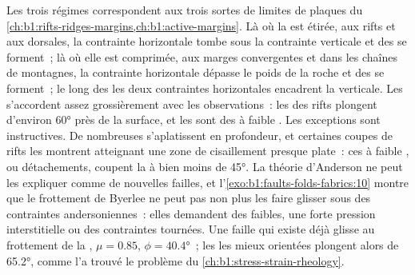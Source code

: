 Les trois régimes correspondent aux trois sortes de limites de plaques du
\cref{ch:b1:rifts-ridges-margins,ch:b1:active-margins}. Là où la 
est étirée, aux rifts et aux dorsales, la contrainte horizontale tombe sous la
contrainte verticale et des  se forment~; là où elle est comprimée, aux marges
convergentes et dans les chaînes de montagnes, la contrainte horizontale dépasse le poids de la
roche et des  se forment~; le long des  les deux contraintes horizontales
encadrent la verticale. Les  s'accordent assez grossièrement avec les observations~: les
 des rifts plongent d'environ \ang{60} près de la surface, et les  sont
des  à faible . Les exceptions sont instructives. De nombreuses 
s'aplatissent en profondeur, et certaines coupes de rifts les montrent atteignant une
zone de cisaillement presque plate~: ces  à faible , ou détachements, coupent
la  à bien moins de \ang{45}. La théorie d'Anderson ne peut les expliquer
comme de nouvelles failles, et l'\cref{exo:b1:faults-folds-fabrics:10} montre que
le frottement de Byerlee ne peut pas non plus les faire glisser sous des contraintes andersoniennes~:
elles demandent des  faibles, une forte pression interstitielle ou des contraintes tournées. Une faille
qui existe déjà glisse au frottement de la ,
$\mu = 0.85$, $\phi = \ang{40.4}$~; les  les mieux orientées plongent alors de
\ang{65.2}, comme l'a trouvé le problème du \cref{ch:b1:stress-strain-rheology}.

